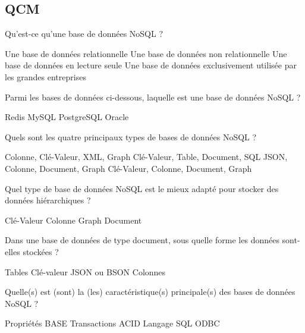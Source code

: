 \documentclass[12pt,a4paper,addpoints,answers]{exam}
\begin{document}
	\begin{questions}
		
		\section*{QCM}
		
		\question[\half] Qu'est-ce qu'une base de données NoSQL ?
		\begin{checkboxes}
			\choice Une base de données relationnelle
			\CorrectChoice Une base de données non relationnelle
			\choice Une base de données en lecture seule
			\choice Une base de données exclusivement utilisée par les grandes entreprises
		\end{checkboxes}
		
		\question[\half] Parmi les bases de données ci-dessous, laquelle est une base de données NoSQL ?
		\begin{checkboxes}
			\CorrectChoice Redis
			\choice MySQL
			\choice PostgreSQL
			\choice Oracle
		\end{checkboxes}
		
		\question[\half] Quels sont les quatre principaux types de bases de données NoSQL ?
		\begin{checkboxes}
			\choice Colonne, Clé-Valeur, XML, Graph
			\choice Clé-Valeur, Table, Document, SQL
			\choice JSON, Colonne, Document, Graph
			\CorrectChoice Clé-Valeur, Colonne, Document, Graph
		\end{checkboxes}
		
		\question[\half] Quel type de base de données NoSQL est le mieux adapté pour stocker des données hiérarchiques ?
		\begin{checkboxes}
			\choice Clé-Valeur
			\choice Colonne
			\CorrectChoice Graph
			\choice Document
		\end{checkboxes}
		
		\question[\half] Dans une base de données de type document, sous quelle forme les données sont-elles stockées ?
		\begin{checkboxes}
			\choice Tables 
			\choice Clé-valeur
			\CorrectChoice JSON ou BSON
			\choice Colonnes
		\end{checkboxes}
		
		\question[1] Quelle(s) est (sont) la (les) caractéristique(s) principale(s) des bases de données NoSQL ?
		\begin{checkboxes}
			\CorrectChoice Propriétés BASE
			\choice Transactions ACID
			\choice Langage SQL
			\choice ODBC
		\end{checkboxes}
		

\end{questions}
\end{document}
